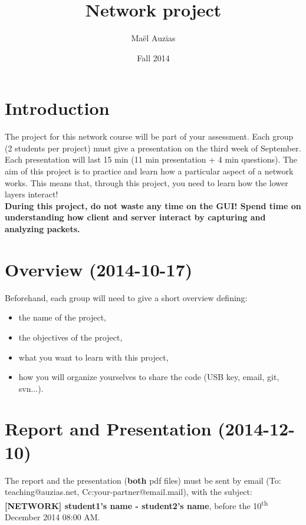\documentclass[11pt]{article}
\begin{document}
 
\title{Network project}
\date{Fall 2014}
\author{Maël Auzias}
\maketitle

\section{Introduction}
The project for this network course will be part of your assessment. Each group (2 students per project) must give a presentation on the third week of September. Each presentation will last 15 min (11 min presentation + 4 min questions). The aim of this project is to practice and learn how a particular aspect of a network works. This means that, through this project, you need to learn how the lower layers interact!\\
\textbf{During this project, do not waste any time on the GUI! Spend time on understanding how client and server interact by capturing and analyzing packets.}

\section{Overview (2014-10-17)}
Beforehand, each group will need to give a short overview defining:
  \begin{itemize}
    \item the name of the project,
    \item the objectives of the project,
    \item what you want to learn with this project,
    \item how you will organize yourselves to share the code (USB key, email, git, svn...).
  \end{itemize}

\section{Report and Presentation (2014-12-10)}
The report and the presentation (\textbf{both} pdf files) must be sent by email (To: teaching@auzias.net, Cc:your-partner@email.mail), with the subject: \textbf{[NETWORK] student1's name - student2's name}, before the 10\textsuperscript{th} December 2014 08:00 AM.
\end{document}
